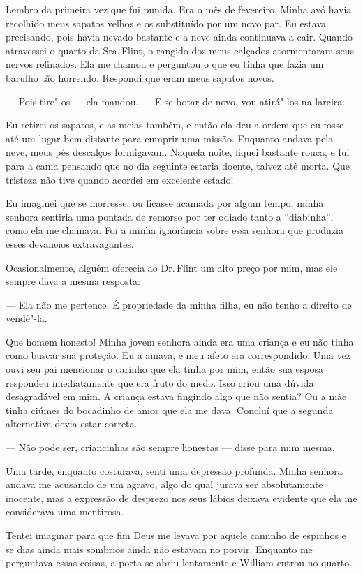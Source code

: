 Lembro da primeira vez que fui punida.
Era o mês de fevereiro. Minha avó havia recolhido meus sapatos velhos e
os substituído por um novo par. Eu estava precisando, pois havia nevado
bastante e a neve ainda continuava a cair. Quando atravessei o quarto da
Sra.\,Flint, o rangido dos meus calçados atormentaram seus nervos
refinados. Ela me chamou e perguntou o que eu tinha que fazia um barulho
tão horrendo. Respondi que eram meus sapatos novos.

--- Pois tire"-os --- ela mandou. --- E se botar de novo, vou atirá"-los
na lareira.

Eu retirei os sapatos, e as meias
também, e então ela deu a ordem que eu fosse até um lugar bem distante
para cumprir uma missão. Enquanto andava pela neve, meus pés descalços
formigavam. Naquela noite, fiquei bastante rouca, e fui para a cama
pensando que no dia seguinte estaria doente, talvez até morta. Que
tristeza não tive quando acordei em excelente estado!

Eu imaginei que se morresse, ou ficasse
acamada por algum tempo, minha senhora sentiria uma pontada de remorso
por ter odiado tanto a ``diabinha'', como ela me chamava. Foi a minha
ignorância sobre essa senhora que produzia esses devaneios
extravagantes.

Ocasionalmente, alguém oferecia ao Dr.\,Flint um alto preço por mim, mas ele sempre dava a mesma resposta:

--- Ela não me pertence. É propriedade da minha filha, eu não tenho a
direito de vendê"-la.

Que homem honesto! Minha jovem senhora ainda era uma criança e eu não
tinha como buscar sua proteção. Eu a amava, e meu afeto era
correspondido. Uma vez ouvi seu pai mencionar o carinho que ela tinha
por mim, então sua esposa respondeu imediatamente que era fruto do medo.
Isso criou uma dúvida desagradável em mim. A criança estava fingindo
algo que não sentia? Ou a mãe tinha ciúmes do bocadinho de amor que ela
me dava. Concluí que a segunda alternativa devia estar correta.

--- Não pode ser, criancinhas são sempre honestas --- disse para mim
mesma.

Uma tarde, enquanto costurava, senti
uma depressão profunda. Minha senhora andava me acusando de um agravo,
algo do qual jurava ser absolutamente inocente, mas a expressão de
desprezo nos seus lábios deixava evidente que ela me considerava uma
mentirosa.

Tentei imaginar para que fim Deus me
levava por aquele caminho de espinhos e se dias ainda mais sombrios
ainda não estavam no porvir. Enquanto me perguntava essas coisas, a
porta se abriu lentamente e William entrou no quarto.

